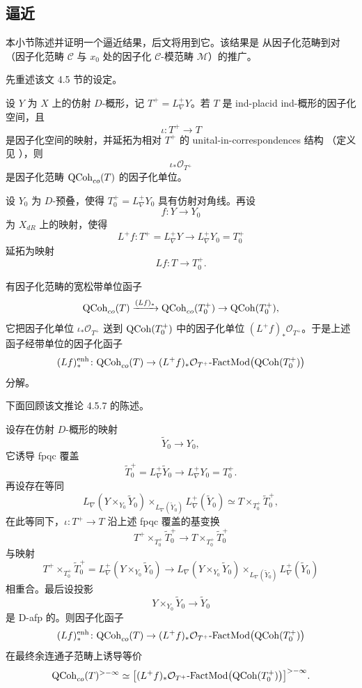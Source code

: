 
\subsection{逼近}
\label{sec:approximation}

本小节陈述并证明一个逼近结果，后文将用到它。该结果是 \cite[推论 4.5.7]{ABC+24a}
从因子化范畴到对（因子化范畴 $\mathcal{C}$ 与 $x_0$ 处的因子化 $\mathcal{C}$-模范畴
$\mathcal{M}$）的推广。

先重述该文 4.5 节的设定。

设 $Y$ 为 $X$ 上的仿射 $D$-概形，记 $T^+=L^+_\nabla Y$。若 $T$ 是 ind-placid
ind-概形的因子化空间，且
\[
\iota\colon T^+\to T
\]
是因子化空间的映射，并延拓为相对 $T^+$ 的 unital-in-correspondences 结构
（定义见 \cite[附录 C.10.6]{ABC+24a}），则
\[
\iota_*\mathcal{O}_{T^+}
\]
是因子化范畴 $\mathrm{QCoh}_{co}(T)$ 的因子化单位。

设 $Y_0$ 为 $D$-预叠，使得 $T^+_0=L^+_\nabla Y_0$ 具有仿射对角线。再设
\[
f\colon Y\to Y_0
\]
为 $X_{dR}$ 上的映射，使得
\[
L^+f\colon T^+=L^+_\nabla Y\to L^+_\nabla Y_0=T^+_0
\]
延拓为映射
\[
Lf\colon T\to T^+_0 .
\]

有因子化范畴的宽松带单位函子
\[
\mathrm{QCoh}_{co}(T)\xrightarrow{(Lf)_*}\mathrm{QCoh}_{co}(T^+_0)\to \mathrm{QCoh}(T^+_0),
\]
它把因子化单位 $\iota_*\mathcal{O}_{T^+}$ 送到 $\mathrm{QCoh}(T^+_0)$ 中的因子化单位
$(L^+f)_*\mathcal{O}_{T^+}$。于是上述函子经带单位的因子化函子
\[
(Lf)^{\mathrm{enh}}_*\colon \mathrm{QCoh}_{co}(T)\to
(L^+f)_*\mathcal{O}_{T^+}\text{-}\mathrm{FactMod}\bigl(\mathrm{QCoh}(T^+_0)\bigr)
\]
分解。

下面回顾该文推论 4.5.7 的陈述。

\begin{proposition}
\label{prop:approx-ABC}\label{prop:3.1.5.1}
设存在仿射 $D$-概形的映射
\[
\widetilde{Y}_0\to Y_0,
\]
它诱导 fpqc 覆盖
\[
\widetilde{T}^+_0=L^+_\nabla\widetilde{Y}_0\to L^+_\nabla Y_0=T^+_0 .
\]
再设存在等同
\[
L_\nabla(Y\times_{Y_0}\widetilde{Y}_0)\times_{L_\nabla(\widetilde{Y}_0)}
L^+_\nabla(\widetilde{Y}_0)
\simeq T\times_{T^+_0}\widetilde{T}^+_0,
\]
在此等同下，$\iota\colon T^+\to T$ 沿上述 fpqc 覆盖的基变换
\[
T^+\times_{T^+_0}\widetilde{T}^+_0\to T\times_{T^+_0}\widetilde{T}^+_0
\]
与映射
\[
T^+\times_{T^+_0}\widetilde{T}^+_0
=L^+_\nabla(Y\times_{Y_0}\widetilde{Y}_0)\to
L_\nabla(Y\times_{Y_0}\widetilde{Y}_0)\times_{L_\nabla(\widetilde{Y}_0)}
L^+_\nabla(\widetilde{Y}_0)
\]
相重合。最后设投影
\[
Y\times_{Y_0}\widetilde{Y}_0\to \widetilde{Y}_0
\]
是 D-afp 的。则因子化函子
\[
(Lf)^{\mathrm{enh}}_*\colon \mathrm{QCoh}_{co}(T)\to
(L^+f)_*\mathcal{O}_{T^+}\text{-}\mathrm{FactMod}\bigl(\mathrm{QCoh}(T^+_0)\bigr)
\]
在最终余连通子范畴上诱导等价
\[
\mathrm{QCoh}_{co}(T)^{>-\infty}
\simeq\bigl[(L^+f)_*\mathcal{O}_{T^+}\text{-}\mathrm{FactMod}
\bigl(\mathrm{QCoh}(T^+_0)\bigr)\bigr]^{>-\infty}.
\]
\end{proposition}

